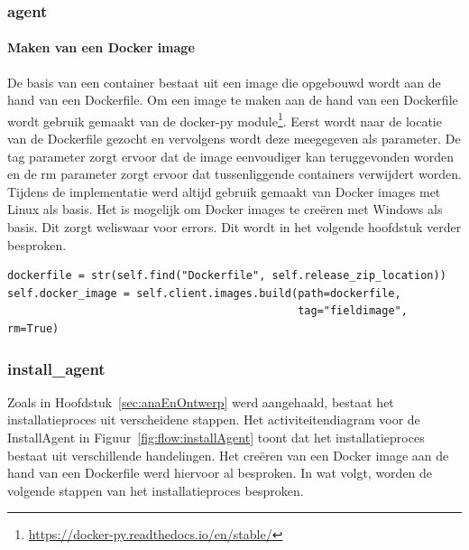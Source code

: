 \subsubsection{agent}\label{sec:agentImpl}
\paragraph{Maken van een Docker image}
De basis van een container bestaat uit een image die opgebouwd wordt aan de hand van een Dockerfile.
Om een image te maken aan de hand van een Dockerfile wordt gebruik gemaakt van de docker-py module\footnote{\url{https://docker-py.readthedocs.io/en/stable/}}.
Eerst wordt naar de locatie van de Dockerfile gezocht en vervolgens wordt deze meegegeven als parameter.
De tag parameter zorgt ervoor dat de image eenvoudiger kan teruggevonden worden en de rm parameter zorgt ervoor dat tussenliggende containers verwijdert worden.
Tijdens de implementatie werd altijd gebruik gemaakt van Docker images met Linux als basis.
Het is mogelijk om Docker images te creëren met Windows als basis.
Dit zorgt weliswaar voor errors.
Dit wordt in het volgende hoofdstuk verder besproken.

\begin{minipage}{\linewidth}
\begin{center}
\begin{lstlisting}[caption={Creatie van een Docker image},label={list:createImage}]
dockerfile = str(self.find("Dockerfile", self.release_zip_location))
self.docker_image = self.client.images.build(path=dockerfile,
                                             tag="fieldimage", rm=True)
\end{lstlisting}
\end{center}
\end{minipage}

\subsubsection{install\_agent}
Zoals in Hoofdstuk~\ref{sec:anaEnOntwerp} werd aangehaald, bestaat het installatieproces uit verscheidene stappen.
Het activiteitendiagram voor de InstallAgent in Figuur~\ref{fig:flow:installAgent} toont dat het installatieproces bestaat uit verschillende handelingen.
Het creëren van een Docker image aan de hand van een Dockerfile werd hiervoor al besproken.
In wat volgt, worden de volgende stappen van het installatieproces besproken.

